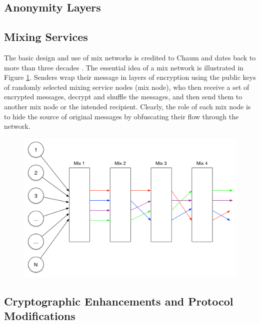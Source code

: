 \subsection{Anonymity Layers}

\subsection{Mixing Services}
The basic design and use of mix networks is credited to Chaum and dates back to more than three decades \cite{Chaum81-Mix}. The essential idea of a mix network is illustrated in Figure \ref{fig:mix-design}. Senders wrap their message in layers of encryption using the public keys of randomly selected mixing service nodes (mix node), who then receive a set of encrypted messages, decrypt and shuffle the messages, and then send them to another mix node or the intended recipient. Clearly, the role of each mix node is to hide the source of original messages by obfuscating their flow through the network.

\begin{figure}
\begin{center}
\includegraphics[scale=0.35]{images/mix_design.pdf}
\label{TODO.}
\label{fig:mix-design}
\end{center}
\end{figure}


\subsection{Cryptographic Enhancements and Protocol Modifications}

